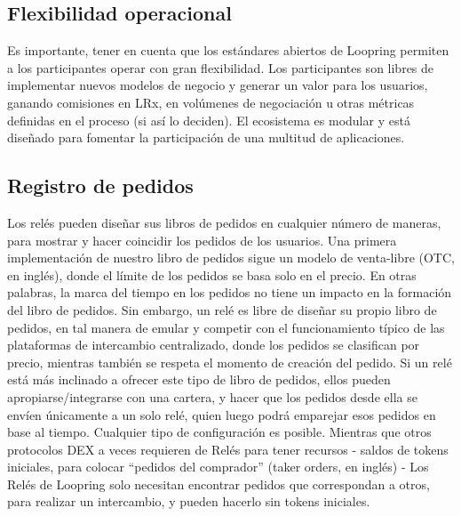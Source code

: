 \documentclass[UTF8,nofonts]{article}
\begin{document}
\begin{multicols}{2}
\section{Flexibilidad operacional\label{sec:business_model}}
Es importante, tener en cuenta que los est\'andares abiertos de Loopring permiten a los participantes operar con gran flexibilidad. Los participantes son libres de implementar nuevos modelos de negocio y generar un valor para los usuarios, ganando comisiones en LRx, en vol\'umenes de negociaci\'on u otras m\'etricas definidas en el proceso (si as\'i lo deciden). El ecosistema es modular y est\'a dise\~nado para fomentar la participaci\'on de una multitud de aplicaciones.

\subsection{Registro de pedidos\label{sec:order_book}}
Los rel\'es pueden dise\~nar sus libros de pedidos en cualquier n\'umero de maneras, para mostrar y hacer coincidir los pedidos de los usuarios. Una primera implementaci\'on de nuestro libro de pedidos sigue un modelo de venta-libre (OTC, en ingl\'es), donde el l\'imite de los pedidos se basa solo en el precio. En otras palabras, la marca del tiempo en los pedidos no tiene un impacto en la formaci\'on del libro de pedidos. Sin embargo, un rel\'e es libre de dise\~nar su propio libro de pedidos, en tal manera de emular y competir con el funcionamiento t\'ipico de las plataformas de intercambio centralizado, donde los pedidos se clasifican por precio, mientras tambi\'en se respeta el momento de creaci\'on del pedido. Si un rel\'e est\'a m\'as inclinado a ofrecer este tipo de libro de pedidos, ellos pueden apropiarse/integrarse con una cartera, y hacer que los pedidos desde ella se env\'ien \'unicamente a un solo rel\'e, quien luego podr\'a emparejar esos pedidos en base al tiempo. Cualquier tipo de configuraci\'on es posible.
Mientras que otros protocolos DEX a veces requieren de Rel\'es para tener recursos - saldos de tokens iniciales, para colocar \enquote{pedidos del comprador} (taker orders, en ingl\'es) - Los Rel\'es de Loopring solo necesitan encontrar pedidos que correspondan a otros, para realizar un intercambio, y pueden hacerlo sin tokens iniciales.




\end{multicols}
\end{document}
